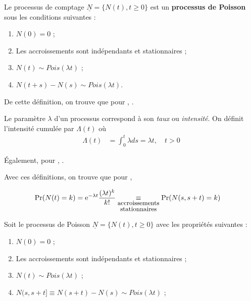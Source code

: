 \documentclass[10pt, french]{article}
\begin{document}
\begin{multicols*}{2}
\begin{definitionNOHFILL}
Le processus de comptage $\underline{N}	=	\{N(t), t \geq 0\}$ est un \textbf{processus de Poisson} sous les conditions suivantes :
\begin{enumerate}[label = \circled{\arabic*}{trueblue}]
	\item	$N(0)	=	0$ ;
	\item	Les accroissements sont indépendants et stationnaires ;
	\item	$N(t)	\sim	Pois(\lambda t)$ ;
	\item	$N(t + s) - N(s) \sim Pois(\lambda t)$.
\end{enumerate}

\bigskip

De cette définition, on trouve que pour , \lfbox[formula]{$N(s, s + t]	=	N(s + t)	-	N(s)$}.
\end{definitionNOHFILL}

\begin{definitionNOHFILLsub}
Le paramètre $\lambda$ d'un processus correspond à son \textit{taux} ou \textit{intensité}. On définit l'intensité cumulée par $\Lambda(t)$ où 
\begin{align*}
\Lambda(t)
	&=	\int_{0}^{t} \lambda ds
	=	\lambda t, \quad t > 0
\end{align*}

\bigskip

Également, pour , \lfbox[formula]{$\Lambda(s, s + t]	=	\Lambda(s + t)	-	\Lambda(s)$}.
\end{definitionNOHFILLsub}

\bigskip

Avec ces définitions, on trouve que pour , 

\begin{align*}
	\Pr(N(t)	=	k)
	&=	\textrm{e}^{-\lambda t} \frac{(\lambda t)^{k}}{k!}	
	\underset{\small\shortstack{accroissements\\ stationnaires}}{\equiv} \Pr(N(s, s + t)	=	k)
\end{align*}

\bigskip

\begin{definitionNOHFILLprop}
Soit le processus de Poisson $\underline{N}	=	\{N(t), t \geq 0\}$ avec les propriétés suivantes :
\begin{enumerate}[label = \rectangled{\arabic*}{lightgray}]
	\item	$N(0)	=	0$ ;
	\item	Les accroissements sont indépendants et stationnaires ;
	\item	$N(t)	\sim	Pois(\lambda t)$ ;
	\item	$N(s, s + t]	\equiv N(s + t) - N(s) \sim Pois(\lambda t)$ ;
\end{enumerate}


\end{definitionNOHFILLprop}
\end{multicols*}
\end{document}
